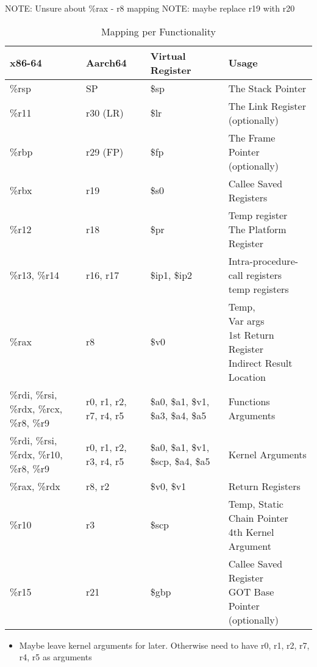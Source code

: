 \documentclass[11pt]{article}
\begin{document}
NOTE: Unsure about \%rax - r8 mapping
NOTE: maybe replace r19 with r20

\begin{table}[ht]
\caption{Mapping per Functionality}
\begin{adjustwidth}{-4.3cm}{-4.3cm}
\begin{tabular}{|l|l|l|l|}
    \hline
    \textbf{x86-64} & \textbf{Aarch64} & \textbf{Virtual Register} & \textbf{Usage} \\
    \hline
    \%rsp & SP & \$sp & The Stack Pointer \\
    \hline
    \%r11 & r30 (LR) & \$lr & The Link Register (optionally) \\
    \hline
    \%rbp & r29 (FP) & \$fp & The Frame Pointer (optionally) \\
    \hline
    \%rbx & r19 & \$s0 & Callee Saved Registers \\
    \hline
    \%r12 & r18 & \$pr & \pbox{20cm}{Temp register \\ The Platform Register} \\
    \hline
    \%r13, \%r14 & r16, r17 & \$ip1, \$ip2 & \pbox{20cm}{Intra-procedure-call registers \\ temp registers} \\
    \hline
    \%rax & r8 & \$v0 & \pbox{20cm}{Temp, \\  Var args \\ 1st Return Register \\ Indirect Result Location} \\
    \hline
    \%rdi, \%rsi, \%rdx, \%rcx, \%r8, \%r9 & r0, r1, r2, r7, r4, r5 & \$a0, \$a1, \$v1, \$a3, \$a4, \$a5 & Functions Arguments \\
    \hline
    \%rdi, \%rsi, \%rdx, \%r10, \%r8, \%r9 & r0, r1, r2, r3, r4, r5 & \$a0, \$a1, \$v1, \$scp, \$a4, \$a5 & Kernel Arguments \\
    \hline
    \%rax, \%rdx & r8, r2 & \$v0, \$v1 & Return Registers \\
    \hline
    \%r10 & r3 & \$scp & \pbox{20cm}{Temp, Static Chain Pointer \\ 4th Kernel Argument} \\
    \hline
    \%r15 & r21 & \$gbp & \pbox{20cm}{Callee Saved Register \\ GOT Base Pointer (optionally)} \\
    \hline
\end{tabular}
\end{adjustwidth}\label{tab:mappings_per_func}
\end{table}

    \begin{itemize}
        \item Maybe leave kernel arguments for later.
        Otherwise need to have r0, r1, r2, r7, r4, r5 as arguments
    \end{itemize}
\end{document}
